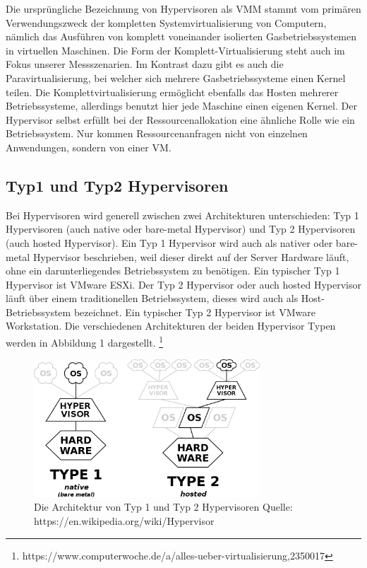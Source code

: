 \documentclass[conference]{IEEEtran}
\newcommand{\citep}{\cite}
\begin{document}
Die ursprüngliche Bezeichnung von Hypervisoren als VMM stammt vom primären Verwendungszweck der kompletten Systemvirtualisierung von Computern, nämlich das Ausführen von komplett voneinander isolierten Gasbetriebssystemen in virtuellen Maschinen. Die Form der Komplett-Virtualisierung steht auch im Fokus unserer Messszenarien. Im Kontrast dazu gibt es auch die Paravirtualisierung, bei welcher sich mehrere Gasbetriebssysteme einen Kernel teilen. Die Komplettvirtualisierung ermöglicht ebenfalls das Hosten mehrerer Betriebssysteme, allerdings benutzt hier jede Maschine einen eigenen Kernel. Der Hypervisor selbst erfüllt bei der Ressourcenallokation eine ähnliche Rolle wie ein Betriebssystem. Nur kommen Ressourcenanfragen nicht von einzelnen Anwendungen, sondern von einer VM. \citep{Goldberg1973}

\subsection{Typ1 und Typ2 Hypervisoren}
Bei Hypervisoren wird generell zwischen zwei Architekturen unterschieden: Typ 1 Hypervisoren (auch native oder bare-metal Hypervisor) und Typ 2 Hypervisoren (auch hosted Hypervisor). Ein Typ 1 Hypervisor wird auch als nativer oder bare-metal Hypervisor beschrieben, weil dieser direkt auf der Server Hardware läuft, ohne ein darunterliegendes Betriebssystem zu benötigen. Ein typischer Typ 1 Hypervisor ist VMware ESXi. Der Typ 2 Hypervisor oder auch hosted Hypervisor läuft über einem traditionellen Betriebssystem, dieses wird auch als Host-Betriebssystem bezeichnet. Ein typischer Typ 2 Hypervisor ist VMware Workstation. Die verschiedenen Architekturen der beiden Hypervisor Typen werden in Abbildung 1 dargestellt. \footnote{https://www.computerwoche.de/a/alles-ueber-virtualisierung,2350017} \citep{Goldberg1973}

\begin{figure}[!h]
	\centering
	\includegraphics[keepaspectratio,width=8.5cm,height=0.75\textheight]{hypervisors.png}
	\caption{Die Architektur von Typ 1 und Typ 2 Hypervisoren \linebreak Quelle: https://en.wikipedia.org/wiki/Hypervisor}
	\label{architecture}
\end{figure}
\end{document}
